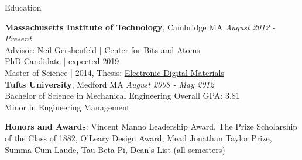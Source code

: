 \documentclass{resume} %
\begin{document}

\begin{rSection}{Education}

{\bf Massachusetts Institute of Technology}, Cambridge MA \hfill {\em August 2012 - Present}
\\ Advisor: Neil Gershenfeld | Center for Bits and Atoms
\\ PhD Candidate | expected 2019
\\ Master of Science | 2014, Thesis: \href{http://cba.mit.edu/docs/theses/14.08.Langford.pdf}{Electronic Digital Materials}
\smallskip
\\{\bf Tufts University}, Medford MA \hfill {\em August 2008 - May 2012}
\\ Bachelor of Science in Mechanical Engineering \hfill { Overall GPA: 3.81}
\\ Minor in Engineering Management

\begingroup\leftskip=0.7cm

{\bf Honors and Awards}: Vincent Manno Leadership Award, The Prize Scholarship of the Class of 1882, O’Leary Design Award, Mead Jonathan Taylor Prize, Summa Cum Laude, Tau Beta Pi, Dean’s List (all semesters)

\endgroup

\end{rSection}
\end{document}
